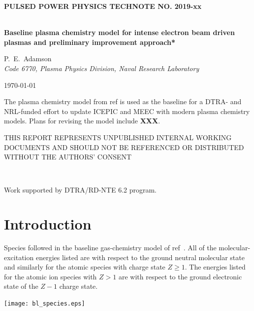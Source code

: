 \documentclass[12pt]{article}
\begin{document}

\graphicspath{{./fig/}}
\begin{titlepage}

\rmfamily
\begin{center}\sffamily\bfseries
PULSED POWER PHYSICS TECHNOTE NO. 2019-xx\\
{~}
\end{center}

\begin{description}[leftmargin=8em,style=nextline,font=\sffamily\bfseries ]
\item[TITLE:]{\bfseries 
Baseline plasma chemistry model for intense electron beam
				driven plasmas and preliminary improvement approach*
}
\item[AUTHORS:]{ P.~E.~Adamson\\
{\itshape Code 6770, Plasma Physics Division, Naval Research Laboratory}}
\item[DATE:]\today
\item[ABSTRACT:] 
The plasma chemistry model from ref \cite{angus2016} is used as the baseline
for a DTRA- and NRL-funded effort to update ICEPIC and MEEC with modern plasma chemistry
models. Plans for revising the model include \textbf{XXX}.
\end{description}

\vfill

{\small
\noindent THIS REPORT REPRESENTS UNPUBLISHED INTERNAL WORKING DOCUMENTS AND SHOULD NOT BE REFERENCED OR DISTRIBUTED WITHOUT THE AUTHORS' CONSENT

{~}

\noindent * Work supported by DTRA/RD-NTE 6.2 program.
}
\end{titlepage}

\pagestyle{myheadings}

\section{Introduction}

\begin{table}
		\caption{Species followed in the baseline gas-chemistry model of ref~\cite{angus2016}. All of the 
		molecular-excitation energies listed are with respect to the ground neutral molecular state and
		similarly for the atomic species with charge state $Z\ge1$. The energies listed for the atomic ion species
		with $Z>1$ are with respect to the ground electronic state of the $Z-1$ charge state.} \label{tab:bl_species}
		\texttt{[image: bl\_species.eps]}
\end{table}
\end{document}

